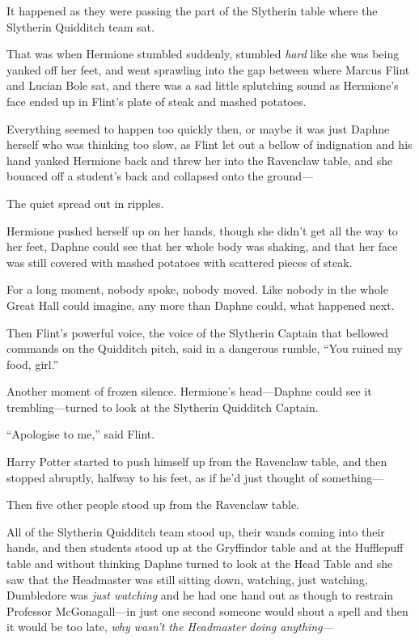 It happened as they were passing the part of the Slytherin table where
the Slytherin Quidditch team sat.

That was when Hermione stumbled suddenly, stumbled \emph{hard} like she
was being yanked off her feet, and went sprawling into the gap between
where Marcus Flint and Lucian Bole sat, and there was a sad little
splutching sound as Hermione's face ended up in Flint's plate of steak
and mashed potatoes.

Everything seemed to happen too quickly then, or maybe it was just
Daphne herself who was thinking too slow, as Flint let out a bellow of
indignation and his hand yanked Hermione back and threw her into the
Ravenclaw table, and she bounced off a student's back and collapsed onto
the ground---

The quiet spread out in ripples.

Hermione pushed herself up on her hands, though she didn't get all the
way to her feet, Daphne could see that her whole body was shaking, and
that her face was still covered with mashed potatoes with scattered
pieces of steak.

For a long moment, nobody spoke, nobody moved. Like nobody in the whole
Great Hall could imagine, any more than Daphne could, what happened
next.

Then Flint's powerful voice, the voice of the Slytherin Captain that
bellowed commands on the Quidditch pitch, said in a dangerous rumble,
``You ruined my food, girl.''

Another moment of frozen silence. Hermione's head---Daphne could see it
trembling---turned to look at the Slytherin Quidditch Captain.

``Apologise to me,'' said Flint.

Harry Potter started to push himself up from the Ravenclaw table, and
then stopped abruptly, halfway to his feet, as if he'd just thought of
something---

Then five other people stood up from the Ravenclaw table.

All of the Slytherin Quidditch team stood up, their wands coming into
their hands, and then students stood up at the Gryffindor table and at
the Hufflepuff table and without thinking Daphne turned to look at the
Head Table and she saw that the Headmaster was still sitting down,
watching, just watching, Dumbledore was \emph{just watching} and he had
one hand out as though to restrain Professor McGonagall---in just one
second someone would shout a spell and then it would be too late,
\emph{why wasn't the Headmaster doing anything}---

